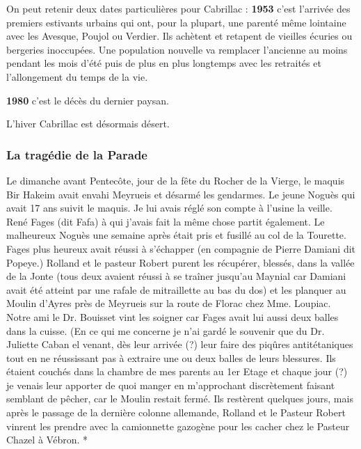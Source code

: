 \vspace{0.3cm}

On peut retenir deux dates particulières pour Cabrillac : \textbf{1953} c’est l’arrivée des premiers
estivants urbains qui ont, pour la plupart, une parenté même lointaine avec les Avesque,
Poujol ou Verdier. Ils achètent et retapent de vieilles écuries ou bergeries inoccupées. Une
population nouvelle va remplacer l’ancienne au moins pendant les mois d’été puis de plus en
plus longtemps avec les retraités et l’allongement du temps de la vie.

\textbf{1980} c’est le décès du dernier paysan.

\vspace{0.3cm}

L’hiver Cabrillac est désormais désert.


\subsubsection{La tragédie de la Parade}

\vspace{0.35cm}

Le dimanche avant Pentecôte, jour de la fête du Rocher de la Vierge, le maquis Bir Hakeim
avait envahi Meyrueis et désarmé les gendarmes. Le jeune Noguès qui avait 17 ans suivit le
maquis. Je lui avais réglé son compte à l’usine la veille. René Fages (dit Fafa) à qui j’avais
fait la même chose partit également. Le malheureux Noguès une semaine après était pris et
fusillé au col de la Tourette. Fages plus heureux avait réussi à s’échapper (en compagnie de
Pierre Damiani dit Popeye.) Rolland et le pasteur Robert purent les récupérer, blessés,
dans la vallée de la Jonte (tous deux avaient réussi à se traîner jusqu’au Maynial car
Damiani avait été atteint par une rafale de mitraillette au bas du dos) et les planquer au
Moulin d’Ayres près de Meyrueis sur la route de Florac chez Mme. Loupiac.
Notre ami le Dr. Bouisset vint les soigner car Fages avait lui aussi deux balles dans la cuisse.
(En ce qui me concerne je n’ai gardé le souvenir que du Dr. Juliette Caban el venant, dès leur
arrivée (?) leur faire des piqûres antitétaniques tout en ne réussissant pas à extraire une ou
deux balles de leurs blessures. Ils étaient couchés dans la chambre de mes parents au 1er
Etage et chaque jour (?) je venais leur apporter de quoi manger en m’approchant
discrètement faisant semblant de pêcher, car le Moulin restait fermé. Ils restèrent quelques
jours, mais après le passage de la dernière colonne allemande, Rolland et le Pasteur Robert
vinrent les prendre avec la camionnette gazogène pour les cacher chez le Pasteur Chazel à
Vébron. *

